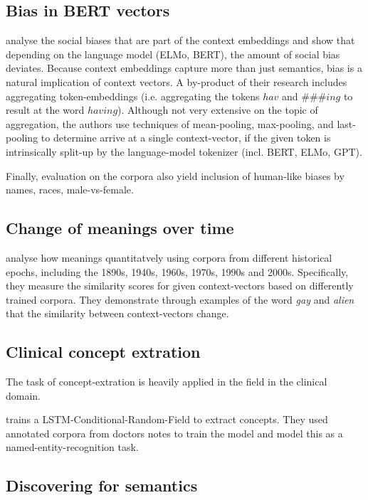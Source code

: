 \documentclass[a4paper,12pt,twoside,openright]{report}
\begin{document}
\subsection{Bias in BERT vectors}

\cite{may19} analyse the social biases that are part of the context embeddings and show that depending on the language model (ELMo, BERT), the amount of social bias deviates. 
Because context embeddings capture more than just semantics, bias is a natural implication of context vectors.
A by-product of their research includes aggregating token-embeddings (i.e. aggregating the tokens $hav$ and $\#\#\#ing$ to result at the word $having$).
Although not very extensive on the topic of aggregation, the authors  use techniques of mean-pooling, max-pooling, and last-pooling to determine arrive at a single context-vector, if the given token is intrinsically split-up by the language-model tokenizer (incl. BERT, ELMo, GPT).

Finally, evaluation on the corpora also yield inclusion of human-like biases \cite{jentzsch19} by names, races, male-vs-female.


\subsection{Change of meanings over time}

\cite{hu19} analyse how meanings quantitatvely using corpora from different historical epochs, including the 1890s, 1940s, 1960s, 1970s, 1990s and 2000s. 
Specifically, they measure the similarity scores for given context-vectors based on differently trained corpora.
They demonstrate through examples of the word \textit{gay} and \textit{alien} that the similarity between context-vectors change.

\subsection{Clinical concept extration}

The task of concept-extration is heavily applied in the field in the clinical domain.

\cite{zhu18} trains a LSTM-Conditional-Random-Field to extract concepts.
They used annotated corpora from doctors notes to train the model and model this as a named-entity-recognition task.


\subsection{Discovering for semantics}
\end{document}
